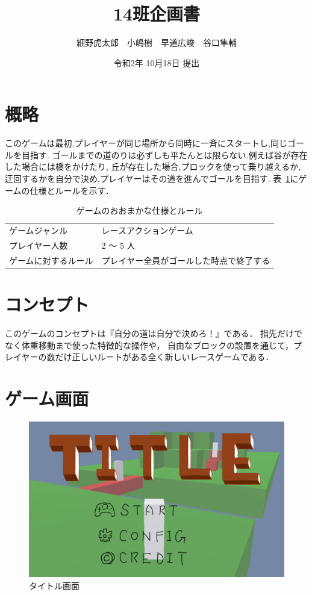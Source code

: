 \documentclass{jarticle}
\title{14班企画書}
\author{細野虎太郎　小嶋樹　早道広峻　谷口隼輔}
\date{令和2年 10月18日 提出}
\begin{document}
\maketitle

\section{概略}
このゲームは最初,プレイヤーが同じ場所から同時に一斉にスタートし,同じゴールを目指す.
ゴールまでの道のりは必ずしも平たんとは限らない.例えば谷が存在した場合には橋をかけたり,
丘が存在した場合,プロックを使って乗り越えるか,迂回するかを自分で決め,プレイヤーはその道を進んでゴールを目指す.
表~\ref{table:rule}にゲームの仕様とルールを示す．
\begin{table}[H]
    \caption{ゲームのおおまかな仕様とルール}
    \label{table:rule}
    \begin{center}
    \begin{tabular}{|l|l|}\hline
    ゲームジャンル & レースアクションゲーム\\
    プレイヤー人数 & 2 ～ 5 人              \\
    ゲームに対するルール & プレイヤー全員がゴールした時点で終了する \\ \hline
    \end{tabular}
    \end{center}
\end{table}


\section{コンセプト}
\label{コンセプト}
このゲームのコンセプトは『自分の道は自分で決めろ！』である．
指先だけでなく体重移動まで使った特徴的な操作や，
自由なブロックの設置を通じて，プレイヤーの数だけ正しいルートがある全く新しいレースゲームである．

\section{ゲーム画面}
\label{ゲーム画面}
\begin{figure}[H]
    \centering
    \label{タイトル画面}
    \includegraphics[scale=0.7]{title.png}
    \caption{タイトル画面}
\end{figure}
\end{document}
